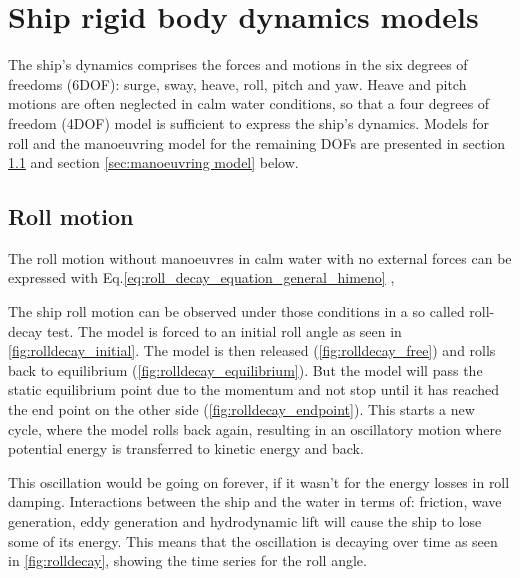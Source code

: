 \chapter{Ship rigid body dynamics models}
\label{ch:models}

The ship's dynamics comprises the forces and motions in the six degrees of freedoms (6DOF): surge, sway, heave, roll, pitch and yaw. Heave and pitch motions are often neglected in calm water conditions, so that a four degrees of freedom (4DOF) model is sufficient to express the ship's dynamics. Models for roll and the manoeuvring model for the remaining DOFs are presented in section \ref{sec:roll} and section \ref{sec:manoeuvring model} below. 

\section{Roll motion} \label{sec:roll}
The roll motion without manoeuvres in calm water with no external forces can be expressed with Eq.\ref{eq:roll_decay_equation_general_himeno} \cite{himeno_prediction_1981},

\noindent The ship roll motion can be observed under those conditions in a so called roll-decay test. The model is forced to an initial roll angle as seen in \autoref{fig:rolldecay_initial}. The model is then released (\autoref{fig:rolldecay_free}) and rolls back to equilibrium (\autoref{fig:rolldecay_equilibrium}). But the model will pass the static equilibrium point due to the momentum and not stop until it has reached the end point on the other side (\autoref{fig:rolldecay_endpoint}). This starts a new cycle, where the model rolls back again, resulting in an oscillatory motion where potential energy is transferred to kinetic energy and back.

\noindent This oscillation would be going on forever, if it wasn't for the energy losses in roll damping. Interactions between the ship and the water in terms of: friction, wave generation, eddy generation and hydrodynamic lift will cause the ship to lose some of its energy. This means that the oscillation is decaying over time as seen in \autoref{fig:rolldecay}, showing the time series for the roll angle.

